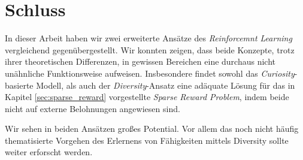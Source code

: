 
\section{Schluss}
\label{sec:conclusion}
In dieser Arbeit haben wir zwei erweiterte Ansätze des \emph{Reinforcemnt Learning} vergleichend gegenübergestellt. Wir konnten zeigen, dass beide Konzepte, trotz ihrer theoretischen Differenzen, in gewissen Bereichen eine durchaus nicht unähnliche Funktionsweise aufweisen. Insbesondere findet sowohl das \emph{Curiosity}-basierte Modell, als auch der \emph{Diversity}-Ansatz eine adäquate Lösung für das in Kapitel \ref{sec:sparse_reward} vorgestellte \emph{Sparse Reward Problem}, indem beide nicht auf externe Belohnungen angewiesen sind.


Wir sehen in beiden Ansätzen großes Potential. Vor allem das noch nicht häufig thematisierte Vorgehen des Erlernens von Fähigkeiten mittels Diversity sollte weiter erforscht werden.